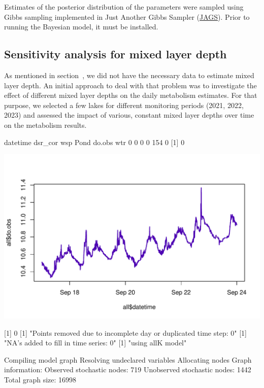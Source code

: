 \documentclass[11pt,lineno]{manuscript}\usepackage[]{graphicx}\usepackage[]{xcolor}
\makeatletter
\def\maxwidth{ %
  \ifdim\Gin@nat@width>\linewidth
    \linewidth
  \else
    \Gin@nat@width
  \fi
}
\newenvironment{kframe}{%
 \def\at@end@of@kframe{}%
 \ifinner\ifhmode%
  \def\at@end@of@kframe{\end{minipage}}%
  \begin{minipage}{\columnwidth}%
 \fi\fi%
 \def\FrameCommand##1{\hskip\@totalleftmargin \hskip-\fboxsep
 \colorbox{shadecolor}{##1}\hskip-\fboxsep
     \hskip-\linewidth \hskip-\@totalleftmargin \hskip\columnwidth}%
 \MakeFramed {\advance\hsize-\width
   \@totalleftmargin\z@ \linewidth\hsize
   \@setminipage}}%
 {\par\unskip\endMakeFramed%
 \at@end@of@kframe}
\makeatother
\begin{document}
Estimates of the posterior distribution of the parameters were sampled using
Gibbs sampling implemented in Just Another Gibbs Sampler
(\href{https://sourceforge.net/projects/mcmc-jags/files/}{JAGS}). Prior to running
the Bayesian model, it must be installed.

\subsection{Sensitivity analysis for mixed layer depth} \label{subsec:sens}

As mentioned in section~, we did not have the necessary
data to estimate mixed layer depth. An initial approach to deal with that problem
was to investigate the effect of different mixed layer depths on the daily metabolism
estimates. For that purpose, we selected a few lakes for different monitoring
periods (2021, 2022, 2023) and assessed the impact of various, constant
mixed layer depths over time on the metabolism results.

\begin{kframe}


{\ttfamily\noindent\itshape\color{messagecolor}{\#\# Lade nötiges Paket: grid}}\end{kframe}datetime  dsr_cor      wsp     Pond   do.obs      wtr 
       0        0        0        0      154        0 
[1] 0


{\centering \includegraphics[width=\maxwidth]{plots/psensanal-1} 

}


[1] 0
[1] "Points removed due to incomplete day or duplicated time step: 0"
[1] "NA's added to fill in time series: 0"
[1] "using allK model"
\begin{kframe}

{\ttfamily\noindent\itshape\color{messagecolor}{\#\# module glm loaded}}\end{kframe}Compiling model graph
   Resolving undeclared variables
   Allocating nodes
Graph information:
   Observed stochastic nodes: 719
   Unobserved stochastic nodes: 1442
   Total graph size: 16998
\end{document}
